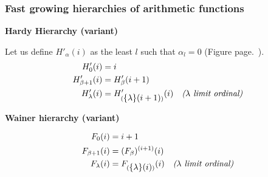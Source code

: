 \documentclass[10pt, fleqn]{beamer}
\begin{document}
\begin{frame}
  \frametitle{Fast growing hierarchies of arithmetic functions}




\begin{block}{}
 
  {\small
\textbf{Hardy Hierarchy (variant)}
    
 Let us define \textcolor{mathcolor}{$H'_\alpha(i)$} as the least $l$ such that \textcolor{mathcolor}{$\alpha_l=0$} (Figure page.~\pageref{fig:accessibility}). 
 {\color{mathcolor}
\begin{align}
  H'_0(i) & = i\\
  H'_{\beta+1}(i) &=H'_\beta(i+1) \\
  H'_\lambda(i) &= H'_{(\mbox{$\{\lambda\}(i+1)$})}(i)  \quad\textit{($\lambda$ limit ordinal)} 
\end{align}}
 

\vspace{4pt}

\textbf{Wainer hierarchy (variant)}

{\color{mathcolor}
\begin{align}
F_0(i)& =i+1\\
F_{\beta+1}(i)&= (F_\beta)^{(i+1)}(i)\\
F_\lambda(i) &= F_{(\mbox{$\{\lambda\}(i)$})} (i) \quad \textit{($\lambda$ limit ordinal)}
\end{align}}}
\end{block}
\end{frame}



 

 

\end{document}
